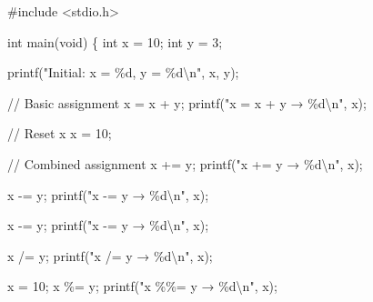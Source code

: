 \documentclass[
  letterpaper,
  DIV=11,
  numbers=noendperiod]{scrreprt}
\newenvironment{Shaded}{\begin{snugshade}}{\end{snugshade}}
\newcommand{\CommentTok}[1]{\textcolor[rgb]{0.37,0.37,0.37}{#1}}
\newcommand{\DataTypeTok}[1]{\textcolor[rgb]{0.68,0.00,0.00}{#1}}
\newcommand{\DecValTok}[1]{\textcolor[rgb]{0.68,0.00,0.00}{#1}}
\newcommand{\ImportTok}[1]{\textcolor[rgb]{0.00,0.46,0.62}{#1}}
\newcommand{\NormalTok}[1]{\textcolor[rgb]{0.00,0.23,0.31}{#1}}
\newcommand{\OperatorTok}[1]{\textcolor[rgb]{0.37,0.37,0.37}{#1}}
\newcommand{\PreprocessorTok}[1]{\textcolor[rgb]{0.68,0.00,0.00}{#1}}
\newcommand{\SpecialCharTok}[1]{\textcolor[rgb]{0.37,0.37,0.37}{#1}}
\newcommand{\StringTok}[1]{\textcolor[rgb]{0.13,0.47,0.30}{#1}}
\begin{document}
\begin{Shaded}
\begin{Highlighting}[]
\PreprocessorTok{\#include }\ImportTok{\textless{}stdio.h\textgreater{}}

\DataTypeTok{int}\NormalTok{ main}\OperatorTok{(}\DataTypeTok{void}\OperatorTok{)} \OperatorTok{\{}
    \DataTypeTok{int}\NormalTok{ x }\OperatorTok{=} \DecValTok{10}\OperatorTok{;}
    \DataTypeTok{int}\NormalTok{ y }\OperatorTok{=} \DecValTok{3}\OperatorTok{;}

\NormalTok{    printf}\OperatorTok{(}\StringTok{"Initial: x = }\SpecialCharTok{\%d}\StringTok{, y = }\SpecialCharTok{\%d\textbackslash{}n}\StringTok{"}\OperatorTok{,}\NormalTok{ x}\OperatorTok{,}\NormalTok{ y}\OperatorTok{);}

    \CommentTok{// Basic assignment}
\NormalTok{    x }\OperatorTok{=}\NormalTok{ x }\OperatorTok{+}\NormalTok{ y}\OperatorTok{;}
\NormalTok{    printf}\OperatorTok{(}\StringTok{"x = x + y → }\SpecialCharTok{\%d\textbackslash{}n}\StringTok{"}\OperatorTok{,}\NormalTok{ x}\OperatorTok{);}

    \CommentTok{// Reset x}
\NormalTok{    x }\OperatorTok{=} \DecValTok{10}\OperatorTok{;}

    \CommentTok{// Combined assignment}
\NormalTok{    x }\OperatorTok{+=}\NormalTok{ y}\OperatorTok{;}
\NormalTok{    printf}\OperatorTok{(}\StringTok{"x += y → }\SpecialCharTok{\%d\textbackslash{}n}\StringTok{"}\OperatorTok{,}\NormalTok{ x}\OperatorTok{);}

\NormalTok{    x }\OperatorTok{{-}=}\NormalTok{ y}\OperatorTok{;}
\NormalTok{    printf}\OperatorTok{(}\StringTok{"x {-}= y → }\SpecialCharTok{\%d\textbackslash{}n}\StringTok{"}\OperatorTok{,}\NormalTok{ x}\OperatorTok{);}

\NormalTok{    x }\OperatorTok{{-}=}\NormalTok{ y}\OperatorTok{;}
\NormalTok{    printf}\OperatorTok{(}\StringTok{"x {-}= y → }\SpecialCharTok{\%d\textbackslash{}n}\StringTok{"}\OperatorTok{,}\NormalTok{ x}\OperatorTok{);}

\NormalTok{    x }\OperatorTok{/=}\NormalTok{ y}\OperatorTok{;}
\NormalTok{    printf}\OperatorTok{(}\StringTok{"x /= y → }\SpecialCharTok{\%d\textbackslash{}n}\StringTok{"}\OperatorTok{,}\NormalTok{ x}\OperatorTok{);}

\NormalTok{    x }\OperatorTok{=} \DecValTok{10}\OperatorTok{;}
\NormalTok{    x }\OperatorTok{\%=}\NormalTok{ y}\OperatorTok{;}
\NormalTok{    printf}\OperatorTok{(}\StringTok{"x }\SpecialCharTok{\%\%}\StringTok{= y → }\SpecialCharTok{\%d\textbackslash{}n}\StringTok{"}\OperatorTok{,}\NormalTok{ x}\OperatorTok{);}


\end{Highlighting}
\end{Shaded}
\end{document}
